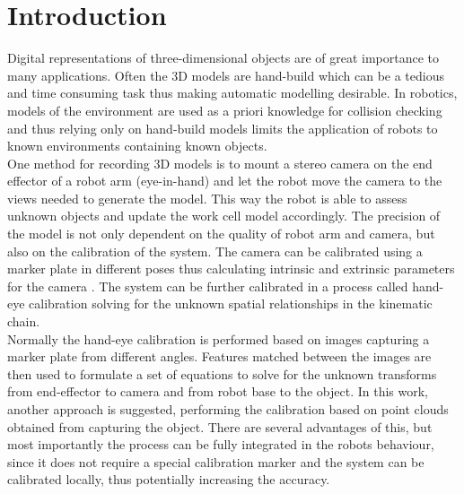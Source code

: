 \chapter{Introduction}
Digital representations of three-dimensional objects are of great importance to many applications. Often the 3D models are hand-build which can be a tedious and time consuming task thus making automatic modelling desirable. In robotics, models of the environment are used as a priori knowledge for collision checking and thus relying only on hand-build models limits the application of robots to known environments containing known objects. \\

One method for recording 3D models is to mount a stereo camera on the end effector of a robot arm (eye-in-hand) and let the robot move the camera to the views needed to generate the model. This way the robot is able to assess unknown objects and update the work cell model accordingly. The precision of the model is not only dependent on the quality of robot arm and camera, but also on the calibration of the system. The camera can be calibrated using a marker plate in different poses thus calculating intrinsic and extrinsic parameters for the camera \cite{Zhang2000}. The system can be further calibrated in a process called hand-eye calibration solving for the unknown spatial relationships in the kinematic chain.\\


Normally the hand-eye calibration is performed based on images capturing a marker plate from different angles. Features matched between the images are then used to formulate a set of equations to solve for the unknown transforms from end-effector to camera and from robot base to the object. In this work, another approach is suggested, performing the calibration based on point clouds obtained from capturing the object. There are several advantages of this, but most importantly the process can be fully integrated in the robots behaviour, since it does not require a special calibration marker and the system can be calibrated locally, thus potentially increasing the accuracy.\\

